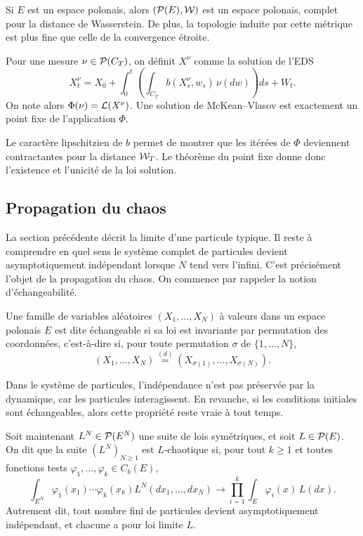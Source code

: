 \begin{thm}{}{}
	Si $E$ est un espace polonais, alors $(\mathcal{P}(E), \mathcal{W})$ est un espace polonais, complet pour la distance de Wasserstein. De plus, la topologie induite par cette métrique est plus fine que celle de la convergence étroite.
\end{thm}

Pour une mesure $\nu\in\mathcal{P}(C_T)$, on définit $X^\nu$ comme la solution de l'EDS
\[
	X_t^\nu
	=
	X_0
	+
	\int_0^t
	\left(
	\int_{C_T}
	b(X_s^\nu,w_s)\,\nu(dw)
	\right)ds
	+
	W_t.
\]
On note alors $\Phi(\nu)=\mathcal{L}(X^\nu)$. Une solution de McKean--Vlasov est exactement un
point fixe de l'application $\Phi$.

Le caractère lipschitzien de $b$ permet de montrer que les itérées de $\Phi$ deviennent
contractantes pour la distance $\mathcal{W}_T$. Le théorème du point fixe donne donc l'existence
et l'unicité de la loi solution.

\subsection{Propagation du chaos}

La section précédente décrit la limite d'une particule typique. Il reste à comprendre en
quel sens le système complet de particules devient asymptotiquement indépendant lorsque
$N$ tend vers l'infini. C'est précisément l'objet de la propagation du chaos. On commence par rappeler la notion d'échangeabilité.

\begin{defn}{}{}
	Une famille de variables aléatoires
	$(X_1,\dots,X_N)$ à valeurs dans un espace polonais $E$ est dite échangeable si sa loi est
	invariante par permutation des coordonnées, c'est-à-dire si, pour toute permutation
	$\sigma$ de $\{1,\dots,N\}$,
	\[
		(X_1,\dots,X_N)
		\overset{(d)}=
		(X_{\sigma(1)},\dots,X_{\sigma(N)}).
	\]
\end{defn}

Dans le système de particules, l'indépendance n'est pas préservée par la dynamique, car les
particules interagissent. En revanche, si les conditions initiales sont échangeables, alors
cette propriété reste vraie à tout temps.

Soit maintenant $L^N\in\mathcal{P}(E^N)$ une suite de lois symétriques, et soit $L\in\mathcal{P}(E)$.
On dit que la suite $(L^N)_{N\geq1}$ est $L$-chaotique si, pour tout $k\geq1$ et toutes
fonctions tests $\varphi_1,\dots,\varphi_k\in C_b(E)$,
\[
	\int_{E^N}
	\varphi_1(x_1)\cdots\varphi_k(x_k)
	L^N(dx_1,\dots,dx_N)
	\longrightarrow
	\prod_{i=1}^{k}
	\int_E
	\varphi_i(x)\,L(dx).
\]
Autrement dit, tout nombre fini de particules devient asymptotiquement indépendant, et
chacune a pour loi limite $L$.

